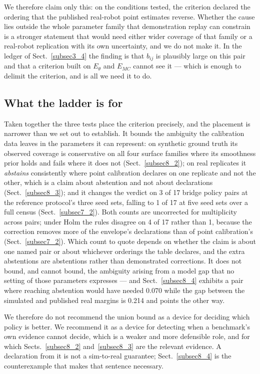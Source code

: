 \documentclass[pdflatex,iicol,sn-apa]{sn-jnl}
\theoremstyle{remark}
\begin{document}
We therefore claim only this: on the conditions tested, the criterion declared the ordering that the
published real-robot point estimates reverse. Whether the cause lies outside the whole parameter
family that demonstration replay can constrain is a stronger statement that would need either wider
coverage of that family or a real-robot replication with its own uncertainty, and we do not make it.
In the ledger of Sect.~\ref{subsec3_4} the finding is that $b_{ij}$ is plausibly large on this pair
and that a criterion built on $E_\theta$ and $E_{MC}$ cannot see it --- which is enough to delimit
the criterion, and is all we need it to do.

\subsection{What the ladder is for}\label{subsec8_5}

Taken together the three tests place the criterion precisely, and the placement is narrower than we
set out to establish. It bounds the ambiguity the calibration data leaves in the parameters it can
represent: on synthetic ground truth its observed coverage is conservative on all four surface
families where its smoothness prior holds and fails where it does not
(Sect.~\ref{subsec8_2}); on real replicates it \emph{abstains} consistently where point calibration
declares on one replicate and not the other, which is a claim about abstention and not about
declarations (Sect.~\ref{subsec8_3}); and it changes the verdict on 3 of 17 bridge policy pairs at
the reference protocol's three seed sets, falling to 1 of 17 at five seed sets over a full census
(Sect.~\ref{subsec7_2}). Both counts are uncorrected for multiplicity across pairs; under Holm the
rules disagree on 4 of 17 rather than 1, because the correction removes more of the envelope's
declarations than of point calibration's (Sect.~\ref{subsec7_2}). Which count to quote depends on
whether the claim is about one named pair or about whichever orderings the table declares, and the
extra abstentions are abstentions rather than demonstrated corrections. It does not bound, and cannot bound, the ambiguity arising from a model gap
that no setting of those parameters expresses --- and Sect.~\ref{subsec8_4} exhibits a pair where
reaching abstention would have needed 0.070 while the gap between the simulated and published real
margins is 0.214 and points the other way.

We therefore do not recommend the union bound as a device for deciding which policy is better. We
recommend it as a device for detecting when a benchmark's own evidence cannot decide, which is a
weaker and more defensible role, and for which Sects.~\ref{subsec8_2} and~\ref{subsec8_3} are the
relevant evidence. A declaration from it is not a sim-to-real guarantee; Sect.~\ref{subsec8_4} is the
counterexample that makes that sentence necessary.
\end{document}
